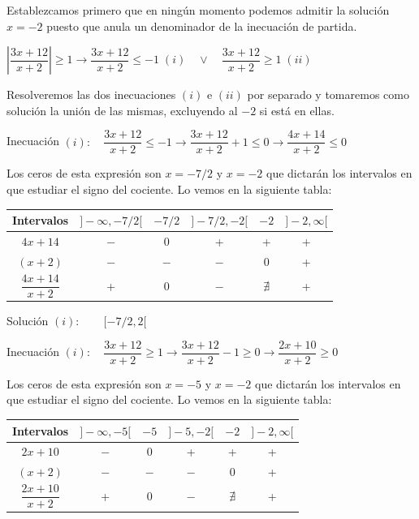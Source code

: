 		\begin{proofw}\renewcommand{\qedsymbol}{$\diamond$}
		
			Establezcamos primero que en ningún momento podemos admitir la solución $x=-2$ puesto que anula un denominador de la inecuación de partida.
			
			$\left| \dfrac {3x+12}{x+2} \right| \ge 1 \to \dfrac {3x+12}{x+2} \le -1 \; (i)\quad \vee \quad \dfrac {3x+12}{x+2} \ge 1 \; (ii)$
			
			Resolveremos las dos inecuaciones $(i)$ e $(ii)$ por separado y tomaremos como solución la unión de las mismas, excluyendo al $-2$ si está en ellas.
 
 			Inecuación $(i): \quad \dfrac {3x+12}{x+2} \le -1 \to \dfrac {3x+12}{x+2} +1\le 0 \to \dfrac {4x+14}{x+2} \le 0$		
 			
 			Los ceros de esta expresión son $x=-7/2$ y $x=-2$ que dictarán los intervalos en que estudiar el signo del cociente. Lo vemos en la siguiente tabla:
 			
 			
 			
 			\begin{table}[H]
 			\centering
			\begin{tabular}{|c|c|c|c|c|c|}
			\hline
 			Intervalos&$]-\infty,-7/2[$  &$-7/2$  &$]-7/2,-2[$  & $-2$ &$]-2,\infty[$ \\ \hline
 			$4x+14$& $-$ & 0 & + &+  & +\\ \hline
 			$(x+2)$& $-$ & $-$  & $-$  &0  & +\\ \hline
 			$\dfrac {4x+14}{x+2}$& + & 0 & $-$ & $\nexists$ & +\\ \hline
			\end{tabular}
			\end{table}
			
			 Solución $(i):\qquad [-7/2,2[$
			
			Inecuación $(i): \quad \dfrac {3x+12}{x+2} \ge 1 \to \dfrac {3x+12}{x+2} -1\ge 0 \to \dfrac {2x+10}{x+2} \ge 0$	
			
			Los ceros de esta expresión son $x=-5$ y $x=-2$ que dictarán los intervalos en que estudiar el signo del cociente. Lo vemos en la siguiente tabla:
 			
 			
 			
 			\begin{table}[H]
 			\centering
			\begin{tabular}{|c|c|c|c|c|c|}
			\hline
 			Intervalos&$]-\infty,-5[$  &$-5$  &$]-5,-2[$  & $-2$ &$]-2,\infty[$ \\ \hline
 			$2x+10$& $-$ & 0 & + &+  & +\\ \hline
 			$(x+2)$& $-$ & $-$  & $-$  &0  & +\\ \hline
 			$\dfrac {2x+10}{x+2}$& + & 0 & $-$ & $\nexists$ & +\\ \hline
			\end{tabular}
			\end{table}
 			

\end{proofw}
